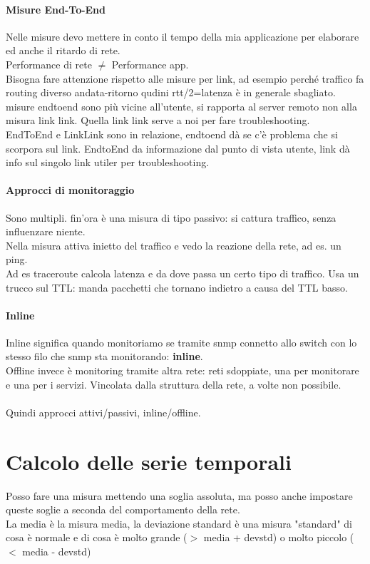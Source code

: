 \documentclass[10pt]{book}
\begin{document}
\paragraph{Misure End-To-End} Nelle misure devo mettere in conto il tempo della mia applicazione per elaborare ed anche il ritardo di rete.\\
Performance di rete $\neq$ Performance app.\\
Bisogna fare attenzione rispetto alle misure per link, ad esempio perché traffico fa routing diverso andata-ritorno qudini rtt/2=latenza è in generale sbagliato. misure endtoend sono più vicine all'utente, si rapporta al server remoto non alla misura link link. Quella link link serve a noi per fare troubleshooting.\\
EndToEnd e LinkLink sono in relazione, endtoend dà se c'è problema che si scorpora sul link. EndtoEnd da informazione dal punto di vista utente, link dà info sul singolo link utiler per troubleshooting.
\paragraph{Approcci di monitoraggio} Sono multipli. fin'ora è una misura di tipo passivo: si cattura traffico, senza influenzare niente.\\
Nella misura attiva inietto del traffico e vedo la reazione della rete, ad es. un ping.\\
Ad es traceroute calcola latenza e da dove passa un certo tipo di traffico. Usa un trucco sul TTL: manda pacchetti che tornano indietro a causa del TTL basso.\\
\paragraph{Inline} Inline significa quando monitoriamo se tramite snmp connetto allo switch con lo stesso filo che snmp sta monitorando: \textbf{inline}.\\
Offline invece è monitoring tramite altra rete: reti sdoppiate, una per monitorare e una per i servizi. Vincolata dalla struttura della rete, a volte non possibile.\\\\
Quindi approcci attivi/passivi, inline/offline.
\section{Calcolo delle serie temporali}
Posso fare una misura mettendo una soglia assoluta, ma posso anche impostare queste soglie a seconda del comportamento della rete.\\
La media è la misura media, la deviazione standard è una misura "standard" di cosa è normale e di cosa è molto grande ($>$ media + devstd) o molto piccolo ($<$ media - devstd)
\end{document}
